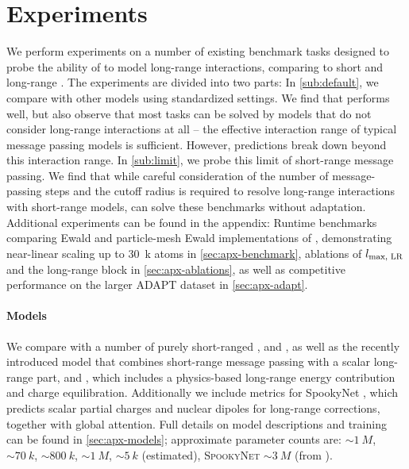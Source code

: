 \documentclass[10pt]{article} %
\newcommand{\CL}[1]{#1}
\newcommand{\ML}[1]{#1}
\begin{document}
\label{sec:model}

\section{Experiments}
\label{sec:experiments}

We perform experiments on a number of existing benchmark tasks designed to probe the ability of \mlps to model long-range interactions, comparing \lorem to short and long-range \mlps{}.
The experiments are divided into two parts: In \cref{sub:default}, we compare \lorem with other models using standardized settings. We find that \lorem{} performs well, but also observe that most tasks can be solved by models that do not consider long-range interactions at all -- the effective interaction range of typical message passing models is sufficient. However, predictions break down beyond this interaction range.
In \cref{sub:limit}, we probe this limit of short-range message passing. We find that while careful consideration of the number of message-passing steps and the cutoff radius is required to resolve long-range interactions with short-range models, \lorem can solve these benchmarks without adaptation. \CL{Additional experiments can be found in the appendix: Runtime benchmarks comparing Ewald and particle-mesh Ewald implementations of \lorem, demonstrating near-linear scaling up to \qty{30}{k} atoms in \cref{sec:apx-benchmark}, ablations of $l_{\text{max, LR}}$ and the long-range block in \cref{sec:apx-ablations}, }\ML{ as well as competitive performance on the larger ADAPT dataset \citep{dxzhrjk2025pre} in \cref{sec:apx-adapt}.}


\paragraph{Models}
We compare \lorem with a number of purely short-ranged \mlps, \mace and \pet, as well as the recently introduced \cace model that combines short-range message passing with a scalar long-range part, and \fgnn, which includes a physics-based long-range energy contribution and charge equilibration. \CL{Additionally we include metrics for SpookyNet \citep{ucgssm2021}, which predicts scalar partial charges and nuclear dipoles for long-range corrections, together with global attention.} Full details on model descriptions and training can be found in \cref{sec:apx-models}; \CL{approximate parameter counts are: \lorem ${\sim}\qty{1}{M}$, \cace  ${\sim}\qty{70}{k}$, \mace  ${\sim}\qty{800}{k}$, \pet ${\sim}\qty{1}{M}$, \fgnn ${\sim}\qty{5}{k}$ (estimated), \textsc{SpookyNet} ${\sim}\qty{3}{M}$ (from \citep{bmc2023}).}
\end{document}
